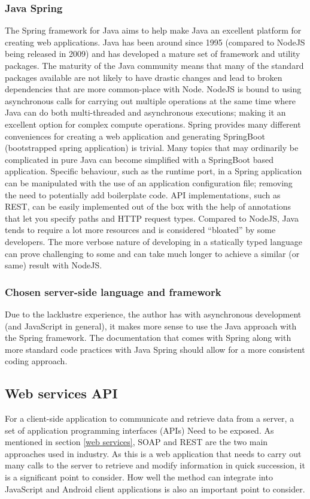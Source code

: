 \subsubsection*{Java Spring}
The Spring framework for Java aims to help make Java an excellent platform for creating web applications.
Java has been around since 1995 (compared to NodeJS being released in 2009) and has developed a mature set of framework and utility packages.
The maturity of the Java community means that many of the standard packages available are not likely to have drastic changes and lead to broken dependencies that are more common-place with Node.
NodeJS is bound to using asynchronous calls for carrying out multiple operations at the same time where Java can do both multi-threaded and asynchronous executions; making it an excellent option for complex compute operations.
Spring provides many different conveniences for creating a web application and generating SpringBoot (bootstrapped spring application) is 
trivial.
Many topics that may ordinarily be complicated in pure Java can become simplified with a SpringBoot based application.
Specific behaviour, such as the runtime port, in a Spring application can be manipulated with the use of an application configuration file; removing the need
to potentially add boilerplate code.
API implementations, such as REST, can be easily implemented out of the box with the help of annotations that let you specify paths and HTTP request types.
Compared to NodeJS, Java tends to require a lot more resources and is considered ``bloated'' by some developers.
The more verbose nature of developing in a statically typed language can prove challenging to some and can take much longer to achieve a similar
(or same) result with NodeJS.

\subsubsection*{Chosen server-side language and framework}
Due to the lacklustre experience, the author has with asynchronous development (and JavaScript in general), it makes more sense to 
use the Java approach with the Spring framework.
The documentation that comes with Spring along with more standard code practices with Java Spring should allow for a more consistent
coding approach.


\subsection{Web services API}
For a client-side application to communicate and retrieve data from a server, a set of application programming interfaces (APIs)
Need to be exposed. As mentioned in section \ref{web services}, SOAP and REST are the two main approaches used in industry.
As this is a web application that needs to carry out many calls to the server to retrieve and modify information in quick
succession, it is a significant point to consider.
How well the method can integrate into JavaScript and Android client applications is also an important point to consider.

